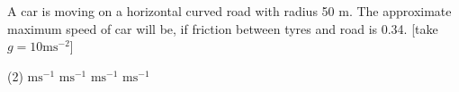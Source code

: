 \item A car is moving on a horizontal curved road with radius 50 m. The approximate maximum speed of car will be, if friction between tyres and road is 0.34. [take \( g = 10 \text{ms}^{-2} \)]
\begin{tasks}(2)
     \( \text{ms}^{-1} \)
     \( \text{ms}^{-1} \)
     \( \text{ms}^{-1} \)
     \( \text{ms}^{-1} \)
\end{tasks}